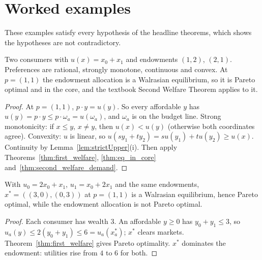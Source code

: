 \section{Worked examples}
\label{sec:ge_examples}

These examples satisfy every hypothesis of the headline theorems, which shows the hypotheses are not contradictory.

\begin{theorem}
\label{thm:ge_lin_example}
\leanok
{}
Two consumers with $u(x) = x_0 + x_1$ and endowments $(1, 2)$, $(2, 1)$. Preferences are rational, strongly monotone,
continuous and convex. At $p = (1, 1)$ the endowment allocation is a Walrasian equilibrium, so it is Pareto optimal and
in the core, and the textbook Second Welfare Theorem applies to it.
\end{theorem}
\begin{proof}
\leanok
At $p = (1, 1)$, $p \cdot y = u(y)$. So every affordable $y$ has $u(y) = p \cdot y \le p \cdot \omega_a = u(\omega_a)$,
and $\omega_a$ is on the budget line. Strong monotonicity: if $x \le y$, $x \neq y$, then $u(x) < u(y)$ (otherwise
both coordinates agree). Convexity: $u$ is linear, so $u(s y_1 + t y_2) = s u(y_1) + t u(y_2) \ge u(x)$. Continuity by
Lemma~\ref{lem:strictUpper}(i). Then apply Theorems~\ref{thm:first_welfare}, \ref{thm:eq_in_core}
and~\ref{thm:second_welfare_demand}.
\end{proof}

\begin{theorem}
\label{thm:ge_asym_example}
\leanok
{}
With $u_0 = 2x_0 + x_1$, $u_1 = x_0 + 2x_1$ and the same endowments, $x^* = ((3, 0), (0, 3))$ at $p = (1, 1)$ is a
Walrasian equilibrium, hence Pareto optimal, while the endowment allocation is not Pareto optimal.
\end{theorem}
\begin{proof}
\leanok
Each consumer has wealth $3$. An affordable $y \ge 0$ has $y_0 + y_1 \le 3$, so $u_a(y) \le 2(y_0 + y_1) \le 6 = u_a(x^*_a)$;
$x^*$ clears markets. Theorem~\ref{thm:first_welfare} gives Pareto optimality. $x^*$ dominates the endowment:
utilities rise from $4$ to $6$ for both.
\end{proof}

